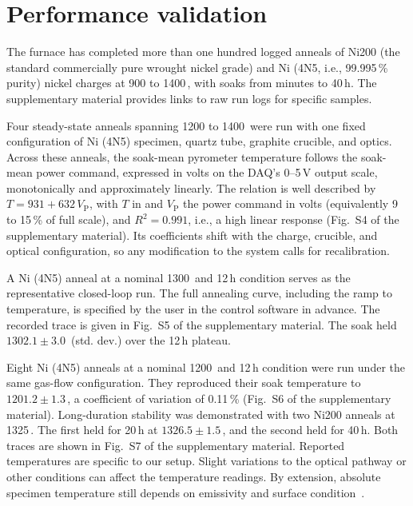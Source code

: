 \documentclass[%
 aip,
 rsi,%
 amsmath,amssymb,
 reprint,%
]{revtex4-2}
\begin{document}
\section{Performance validation}

The furnace has completed more than one hundred logged anneals of Ni200
(the standard commercially pure wrought nickel grade) and
Ni (4N5, i.e., 99.995\,\% purity) nickel charges at 900 to
1400\,\celsius, with soaks from minutes to 40\,h. The supplementary material
provides links to raw run logs for specific samples.

Four steady-state anneals spanning 1200 to 1400\,\celsius{} were run with
one fixed configuration of Ni (4N5) specimen, quartz tube, graphite
crucible, and optics. Across these anneals, the soak-mean pyrometer
temperature follows the soak-mean power command, expressed in volts on
the DAQ's 0--5\,V output scale, monotonically and
approximately linearly. The relation is well described by
$T = 931 + 632\,V_{\mathrm{P}}$, with $T$ in \celsius{} and
$V_{\mathrm{P}}$ the power command in volts (equivalently 9 to 15\,\% of
full scale), and $R^2 = 0.991$, i.e., a high linear response (Fig.~S4 of the supplementary material). Its coefficients shift with the charge, crucible, and optical
configuration, so any modification to the system calls for recalibration.

A
Ni (4N5) anneal at a nominal 1300\,\celsius{} and 12\,h condition serves as
the representative closed-loop run. The full annealing curve, including the
ramp to temperature, is specified by the user in the control software in
advance. The recorded trace is given in Fig.~S5 of the supplementary
material. The soak held $1302.1 \pm 3.0$\,\celsius{} (std. dev.) over the 12\,h
plateau.

Eight Ni (4N5) anneals at a nominal 1200\,\celsius{} and 12\,h condition were
run under the same gas-flow configuration. They reproduced their soak
temperature to $1201.2 \pm 1.3$\,\celsius, a coefficient of variation of
0.11\,\% (Fig.~S6 of the supplementary material). Long-duration stability
was demonstrated with two Ni200 anneals at
1325\,\celsius. The first held for 20\,h at $1326.5 \pm 1.5$\,\celsius,
and the second held for 40\,h. Both traces are shown in Fig.~S7 of the supplementary material.
Reported temperatures are specific to our setup. Slight variations to the
optical pathway or other conditions can affect the temperature readings. By
extension, absolute specimen temperature still depends on emissivity and
surface
condition~\cite{ham2016insituspectralemissivity,giulietti2025spectralemissivitymeasurement,kieruj2016determinationofemissivity}.
\end{document}
